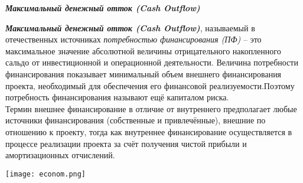 \documentclass[a4paper,12pt]{article}
\begin{document}
\begin{center}
	\textbf{\textit{Максимальный денежный отток (Cash Outflow)}}
\end{center}
\textbf{\textit{Максимальный денежный отток (Cash Outflow)}}, называемый в отечественных источниках \textit{потребностью финансирования (ПФ)} – это максимальное значение абсолютной величины отрицательного накопленного
сальдо от инвестиционной и операционной деятельности. Величина потребности финансирования показывает минимальный объем внешнего
финансирования проекта, необходимый для обеспечения его финансовой
реализуемости.Поэтому потребность финансирования называют ещё капиталом риска.\\
Термин внешнее финансирование в отличие от внутреннего предполагает любые источники финансирования (собственные и привлечённые),
внешние по отношению к проекту, тогда как внутреннее финансирование
осуществляется в процессе реализации проекта за счёт получения чистой
прибыли и амортизационных отчислений.
		\medskip
		\begin{center}
			\texttt{[image: econom.png]} 
		\end{center}
\end{document}
